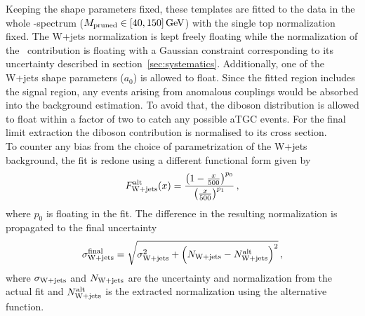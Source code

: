 \noindent Keeping the shape parameters fixed, these templates are fitted to the data in the whole \Mpr -spectrum ($M_\mathrm{pruned} \in [40,150]\,{\rm GeV}$) with the single top normalization fixed. The W+jets normalization is kept freely floating while the normalization of the \ttbar \ contribution is floating with a Gaussian constraint corresponding to its uncertainty described in section~\ref{sec:systematics}. Additionally, one of the W+jets shape parameters ($a_0$) is allowed to float. Since the fitted region includes the signal region, any events arising from anomalous couplings would be absorbed into the background estimation. To avoid that, the diboson distribution is allowed to float within a factor of two to catch any possible aTGC events. For the final limit extraction the diboson contribution is normalised to its cross section.\\

\noindent To counter any bias from the choice of parametrization of the W+jets background, the fit is redone using a different functional form given by
\begin{equation}
F_{\rm W+jets}^{\rm alt}(x)=\frac{\left(1-\frac{x}{500}\right)^{p_0}}{\left(\frac{x}{500}\right)^{p_1}} \, ,
\end{equation}
where $p_0$ is floating in the fit. The difference in the resulting normalization is propagated to the final uncertainty
\begin{equation}
\sigma_{\rm W+jets}^{\rm final} = \sqrt{\sigma_{\rm W+jets}^2 + \left(N_{\rm W+jets} - N_{\rm W+jets}^{\rm alt}\right)^2} \, ,
\label{eq:bkg:wjetsunc}
\end{equation}
where $\sigma_{\rm W+jets}$ and $N_{\rm W+jets}$ are the uncertainty and normalization from the actual fit and $N_{\rm W+jets}^{\rm alt}$ is the extracted normalization using the alternative function. \\

